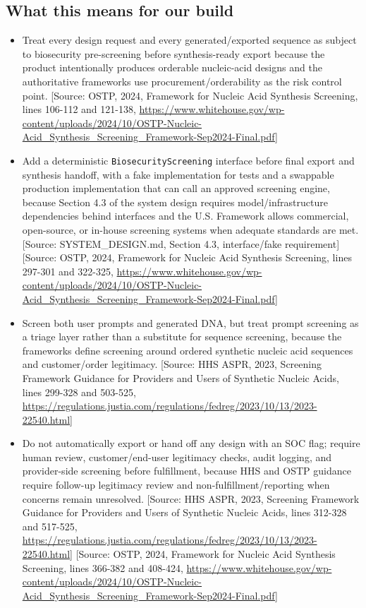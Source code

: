 \documentclass[11pt]{report}
\begin{document}
\subsection{What this means for our build}
\begin{itemize}
\item Treat every design request and every generated/exported sequence as subject to biosecurity pre-screening before synthesis-ready export because the product intentionally produces orderable nucleic-acid designs and the authoritative frameworks use procurement/orderability as the risk control point. [Source: OSTP, 2024, Framework for Nucleic Acid Synthesis Screening, lines 106-112 and 121-138, \url{https://www.whitehouse.gov/wp-content/uploads/2024/10/OSTP-Nucleic-Acid_Synthesis_Screening_Framework-Sep2024-Final.pdf}]
\item Add a deterministic \texttt{BiosecurityScreening} interface before final export and synthesis handoff, with a fake implementation for tests and a swappable production implementation that can call an approved screening engine, because Section 4.3 of the system design requires model/infrastructure dependencies behind interfaces and the U.S. Framework allows commercial, open-source, or in-house screening systems when adequate standards are met. [Source: SYSTEM\_DESIGN.md, Section 4.3, interface/fake requirement] [Source: OSTP, 2024, Framework for Nucleic Acid Synthesis Screening, lines 297-301 and 322-325, \url{https://www.whitehouse.gov/wp-content/uploads/2024/10/OSTP-Nucleic-Acid_Synthesis_Screening_Framework-Sep2024-Final.pdf}]
\item Screen both user prompts and generated DNA, but treat prompt screening as a triage layer rather than a substitute for sequence screening, because the frameworks define screening around ordered synthetic nucleic acid sequences and customer/order legitimacy. [Source: HHS ASPR, 2023, Screening Framework Guidance for Providers and Users of Synthetic Nucleic Acids, lines 299-328 and 503-525, \url{https://regulations.justia.com/regulations/fedreg/2023/10/13/2023-22540.html}]
\item Do not automatically export or hand off any design with an SOC flag; require human review, customer/end-user legitimacy checks, audit logging, and provider-side screening before fulfillment, because HHS and OSTP guidance require follow-up legitimacy review and non-fulfillment/reporting when concerns remain unresolved. [Source: HHS ASPR, 2023, Screening Framework Guidance for Providers and Users of Synthetic Nucleic Acids, lines 312-328 and 517-525, \url{https://regulations.justia.com/regulations/fedreg/2023/10/13/2023-22540.html}] [Source: OSTP, 2024, Framework for Nucleic Acid Synthesis Screening, lines 366-382 and 408-424, \url{https://www.whitehouse.gov/wp-content/uploads/2024/10/OSTP-Nucleic-Acid_Synthesis_Screening_Framework-Sep2024-Final.pdf}]

\end{itemize}
\end{document}
